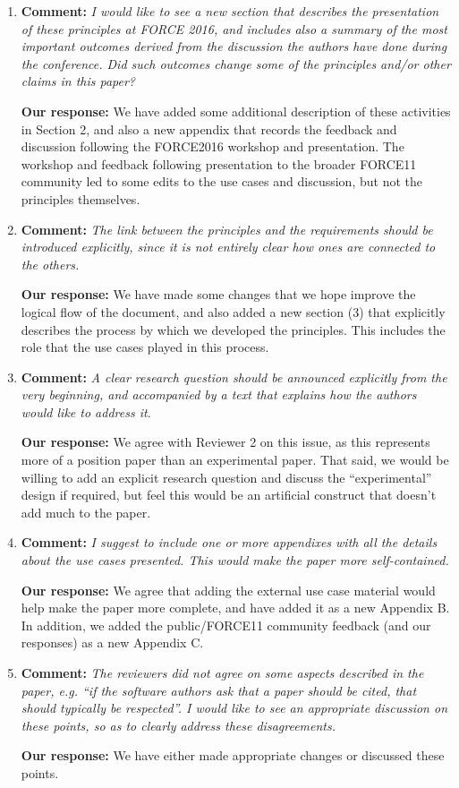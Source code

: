 \documentclass{article}
\begin{document}
\begin{enumerate}
\item  \textbf{Comment:}
\emph{I would like to see a new section that describes the presentation of these principles at FORCE 2016, and includes also a summary of the most important outcomes derived from the discussion the authors have done during the conference. Did such outcomes change some of the principles and/or other claims in this paper?}

\textbf{Our response:}
We have added some additional description of these activities in Section 2,
and also a new appendix that records the feedback and discussion following
the FORCE2016 workshop and presentation. The workshop and feedback following
presentation to the broader FORCE11 community led to some edits to the use
cases and discussion, but not the principles themselves.

\item \textbf{Comment:}
\emph{The link between the principles and the requirements should be introduced explicitly, since it is not entirely clear how ones are connected to the others.}

\textbf{Our response:}
We have made some changes that we hope improve the logical flow of the document,
and also added a new section (3) that explicitly describes the process by which
we developed the principles. This includes the role that the use cases played
in this process.


\item \textbf{Comment:}
\emph{A clear research question should be announced explicitly from the very beginning, and accompanied by a text that explains how the authors would like to address it.}

\textbf{Our response:}
We agree with Reviewer 2 on this issue, as this represents more of a position paper than an experimental paper.
That said, we would be willing to add an explicit research question and discuss the ``experimental'' design if required, but feel this would be an artificial construct that doesn't add much to the paper.


\item \textbf{Comment:}
\emph{I suggest to include one or more appendixes with all the details about the use cases presented. This would make the paper more self-contained.}

\textbf{Our response:}
We agree that adding the external use case material would help make the paper
more complete, and have added it as a new Appendix B. In addition, we added the
public\slash FORCE11 community feedback (and our responses) as a new Appendix C.

\item \textbf{Comment:}
\emph{The reviewers did not agree on some aspects described in the paper, e.g. ``if the software authors ask that a paper should be cited, that should typically be respected''. I would like to see an appropriate discussion on these points, so as to clearly address these disagreements.}

\textbf{Our response:}
We have either made appropriate changes or discussed these points.


\end{enumerate}
\end{document}
